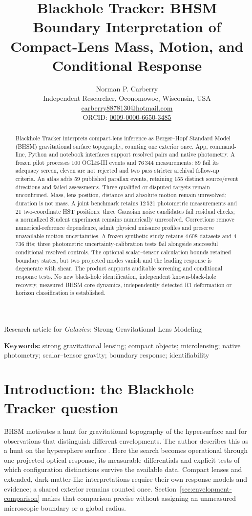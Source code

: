 \documentclass[11pt,a4paper]{article}
\title{\textbf{Blackhole Tracker: BHSM Boundary Interpretation of Compact-Lens Mass, Motion, and Conditional Response}}
\author{Norman P. Carberry\\\small Independent Researcher, Oconomowoc, Wisconsin, USA\\
\small \href{mailto:carberry8878130@hotmail.com}{carberry8878130@hotmail.com}\\
\small ORCID: \href{https://orcid.org/0009-0000-6650-3485}{0009-0000-6650-3485}}
\date{}
\begin{document}
\maketitle
\begin{center}\small Research article for \emph{Galaxies}: Strong Gravitational Lens Modeling\end{center}
\begin{abstract}
Blackhole Tracker interprets compact-lens inference as Berger--Hopf Standard
Model (BHSM) gravitational surface topography, counting one
exterior once. App, command-line, Python and notebook interfaces support
resolved pairs and native photometry. A frozen pilot processes
100 OGLE-III events and 76\,344 measurements: 89 fail its adequacy screen,
eleven are not rejected and two pass stricter archival follow-up criteria.
An atlas adds 59 published parallax events, retaining 155 distinct
source/event directions and failed assessments. Three qualified or disputed
targets remain unconfirmed.
Mass, lens position, distance and absolute motion remain unresolved;
duration is not mass. A joint benchmark retains 12\,521 photometric
measurements and 21 two-coordinate HST positions: three Gaussian noise
candidates fail residual checks; a normalized Student experiment remains
numerically unresolved. Corrections remove numerical-reference dependence,
admit physical nuisance profiles and preserve unavailable motion uncertainties.
A frozen synthetic study retains 4\,608 datasets and 4\,736 fits; three
photometric uncertainty-calibration tests fail alongside successful conditional
resolved controls. The optional scalar--tensor calculation bounds retained
boundary states, but two projected modes vanish and the leading response
is degenerate with shear. The product supports auditable screening and
conditional response tests. No new black-hole identification, independent
known-black-hole recovery, measured BHSM core dynamics, independently
detected R1 deformation or horizon classification is established.
\end{abstract}
\noindent\textbf{Keywords:} strong gravitational lensing; compact objects;
microlensing; native photometry; scalar--tensor gravity; boundary response; identifiability

\section{Introduction: the Blackhole Tracker question}

BHSM motivates a hunt for gravitational topography of the hypersurface
and for observations that distinguish different envelopments. The author
describes this as a hunt on the hypersphere surface
\cite{CarberryEnvelopmentSearch2026}. Here the search becomes operational
through one projected optical response, its measurable differentials and
explicit tests of which configuration distinctions survive the available
data. Compact lenses and extended, dark-matter-like interpretations require
their own response models and evidence; a shared exterior remains counted
once. Section~\ref{sec:envelopment-comparison} makes that comparison precise
without assigning an unmeasured microscopic boundary or a global radius.
\end{document}
